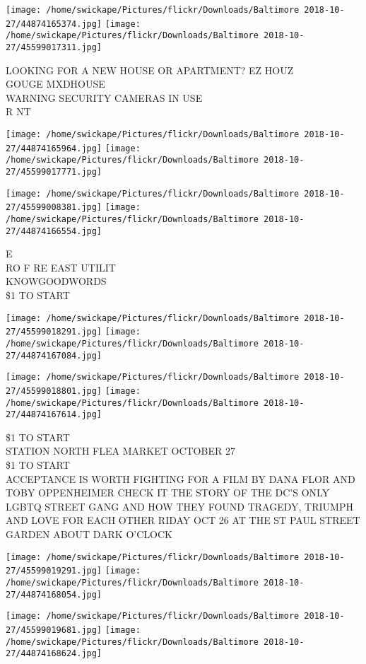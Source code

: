 \documentclass[10pt,letterpaper]{article}
\begin{document}
\texttt{[image: /home/swickape/Pictures/flickr/Downloads/Baltimore 2018-10-27/44874165374.jpg]}
\texttt{[image: /home/swickape/Pictures/flickr/Downloads/Baltimore 2018-10-27/45599017311.jpg]}

LOOKING FOR A NEW HOUSE OR APARTMENT?  EZ HOUZ\\
GOUGE MXDHOUSE\\
WARNING SECURITY CAMERAS IN USE\\
R NT
\pagebreak

\texttt{[image: /home/swickape/Pictures/flickr/Downloads/Baltimore 2018-10-27/44874165964.jpg]}
\texttt{[image: /home/swickape/Pictures/flickr/Downloads/Baltimore 2018-10-27/45599017771.jpg]}

\texttt{[image: /home/swickape/Pictures/flickr/Downloads/Baltimore 2018-10-27/45599008381.jpg]}
\texttt{[image: /home/swickape/Pictures/flickr/Downloads/Baltimore 2018-10-27/44874166554.jpg]}

E\\
RO F RE EAST UTILIT\\
KNOWGOODWORDS\\
\$1 TO START
\pagebreak

\texttt{[image: /home/swickape/Pictures/flickr/Downloads/Baltimore 2018-10-27/45599018291.jpg]}
\texttt{[image: /home/swickape/Pictures/flickr/Downloads/Baltimore 2018-10-27/44874167084.jpg]}

\texttt{[image: /home/swickape/Pictures/flickr/Downloads/Baltimore 2018-10-27/45599018801.jpg]}
\texttt{[image: /home/swickape/Pictures/flickr/Downloads/Baltimore 2018-10-27/44874167614.jpg]}

\$1 TO START\\
STATION NORTH FLEA MARKET OCTOBER 27\\
\$1 TO START\\
ACCEPTANCE IS WORTH FIGHTING FOR A FILM BY DANA FLOR AND TOBY OPPENHEIMER CHECK IT THE STORY OF THE DC'S ONLY LGBTQ STREET GANG AND HOW THEY FOUND TRAGEDY, TRIUMPH AND LOVE FOR EACH OTHER RIDAY OCT 26 AT THE ST PAUL STREET GARDEN ABOUT DARK O'CLOCK
\pagebreak

\texttt{[image: /home/swickape/Pictures/flickr/Downloads/Baltimore 2018-10-27/45599019291.jpg]}
\texttt{[image: /home/swickape/Pictures/flickr/Downloads/Baltimore 2018-10-27/44874168054.jpg]}

\texttt{[image: /home/swickape/Pictures/flickr/Downloads/Baltimore 2018-10-27/45599019681.jpg]}
\texttt{[image: /home/swickape/Pictures/flickr/Downloads/Baltimore 2018-10-27/44874168624.jpg]}
\end{document}
